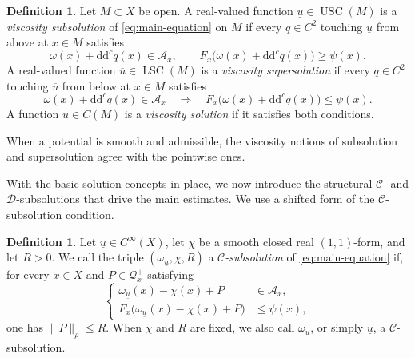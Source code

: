 \documentclass[oneside,english,letterpaper]{amsart}
\numberwithin{equation}{section}
\theoremstyle{plain}
\theoremstyle{definition}
\newtheorem{defn}[thm]{Definition}
\theoremstyle{remark}
\renewcommand{\d}{\mathrm{d}}
\newcommand{\ddc}{\d\d^c}
\begin{document}

\begin{defn}
	\label{def:viscosity-solutions}
	Let $M\subset X$ be open. A real-valued function
	$\underline u\in\operatorname{USC}(M)$ is a \emph{viscosity
		subsolution} of \eqref{eq:main-equation} on $M$ if every
	$q\in C^2$ touching $\underline u$ from above at $x\in M$ satisfies
	$$
	\omega(x)+\ddc q(x)\in\mathcal A_x,
	\qquad F_x\bigl(\omega(x)+\ddc q(x)\bigr)\geq\psi(x).
	$$
	A real-valued function $\overline u\in\operatorname{LSC}(M)$ is a
	\emph{viscosity supersolution} if every $q\in C^2$ touching
	$\overline u$ from below at $x\in M$ satisfies
	$$
	\omega(x)+\ddc q(x)\in\mathcal A_x
	\quad\Longrightarrow\quad
	F_x\bigl(\omega(x)+\ddc q(x)\bigr)\leq\psi(x).
	$$
	A function $u\in C(M)$ is a \emph{viscosity solution} if it
	satisfies both conditions.
\end{defn}

When a potential is smooth and admissible, the viscosity notions of subsolution and supersolution agree with the pointwise ones.



With the basic solution concepts in place, we now introduce the
structural $\mathcal C$- and $\mathcal D$-subsolutions that drive the
main estimates. We use a shifted form of the $\mathcal C$-subsolution
condition.

\begin{defn}
	\label{def:C-subsolution}
	Let $\underline u\in C^\infty(X)$, let $\chi$ be a smooth closed real
	$(1,1)$-form, and let $R>0$. We call the triple
	$(\omega_{\underline u},\chi,R)$ a \emph{$\mathcal C$-subsolution}
	of \eqref{eq:main-equation} if, for every $x\in X$ and
	$P\in\mathcal Q_x^+$ satisfying
	$$
	\left\{
	\begin{aligned}
		\omega_{\underline u}(x)-\chi(x)+P&\in\mathcal A_x,\\
		F_x\bigl(\omega_{\underline u}(x)-\chi(x)+P\bigr)&\leq\psi(x),
	\end{aligned}
	\right.
	$$
	one has $\|P\|_\rho\leq R$.
	When $\chi$ and $R$ are fixed, we also call
	$\omega_{\underline u}$, or simply $\underline u$, a
	$\mathcal C$-subsolution.
\end{defn}
\end{document}
